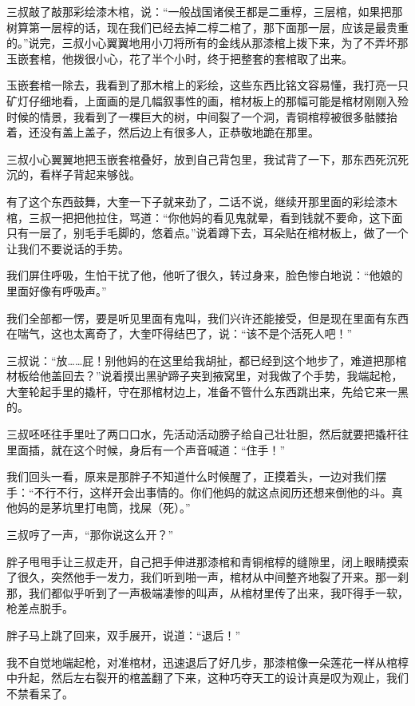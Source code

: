 三叔敲了敲那彩绘漆木棺，说：“一般战国诸侯王都是二重椁，三层棺，如果把那树算第一层椁的话，现在我们已经去掉二椁二棺了，那下面那一层，应该是最贵重的。”说完，三叔小心翼翼地用小刀将所有的金线从那漆棺上拨下来，为了不弄坏那玉嵌套棺，他拨很小心，花了半个小时，终于把整套的套棺取了出来。

玉嵌套棺一除去，我看到了那木棺上的彩绘，这些东西比铭文容易懂，我打亮一只矿灯仔细地看，上面画的是几幅叙事性的画，棺材板上的那幅可能是棺材刚刚入殓时候的情景，我看到了一棵巨大的树，中间裂了一个洞，青铜棺椁被很多骷髅抬着，还没有盖上盖子，然后边上有很多人，正恭敬地跪在那里。

三叔小心翼翼地把玉嵌套棺叠好，放到自己背包里，我试背了一下，那东西死沉死沉的，看样子背起来够戗。

有了这个东西鼓舞，大奎一下子就来劲了，二话不说，继续开那里面的彩绘漆木棺，三叔一把把他拉住，骂道：“你他妈的看见鬼就晕，看到钱就不要命，这下面只有一层了，别毛手毛脚的，悠着点。”说着蹲下去，耳朵贴在棺材板上，做了一个让我们不要说话的手势。

我们屏住呼吸，生怕干扰了他，他听了很久，转过身来，脸色惨白地说：“他娘的里面好像有呼吸声。”

我们全部都一愣，要是听见里面有鬼叫，我们兴许还能接受，但是现在里面有东西在喘气，这也太离奇了，大奎吓得结巴了，说：“该不是个活死人吧！”

三叔说：“放……屁！别他妈的在这里给我胡扯，都已经到这个地步了，难道把那棺材板给他盖回去？”说着摸出黑驴蹄子夹到掖窝里，对我做了个手势，我端起枪，大奎轮起手里的撬杆，守在那棺材边上，准备不管什么东西跳出来，先给它来一黑的。

三叔呸呸往手里吐了两口口水，先活动活动膀子给自己壮壮胆，然后就要把撬杆往里面插，就在这个时候，身后有一个声音喊道：“住手！”

我们回头一看，原来是那胖子不知道什么时候醒了，正摸着头，一边对我们摆手：“不行不行，这样开会出事情的。你们他妈的就这点阅历还想来倒他的斗。真他妈的是茅坑里打电筒，找屎（死）。”

三叔哼了一声，“那你说这么开？”

胖子甩甩手让三叔走开，自己把手伸进那漆棺和青铜棺椁的缝隙里，闭上眼睛摸索了很久，突然他手一发力，我们听到啪一声，棺材从中间整齐地裂了开来。那一刹那，我们都似乎听到了一声极端凄惨的叫声，从棺材里传了出来，我吓得手一软，枪差点脱手。

胖子马上跳了回来，双手展开，说道：“退后！”

我不自觉地端起枪，对准棺材，迅速退后了好几步，那漆棺像一朵莲花一样从棺椁中升起，然后左右裂开的棺盖翻了下来，这种巧夺天工的设计真是叹为观止，我们不禁看呆了。

